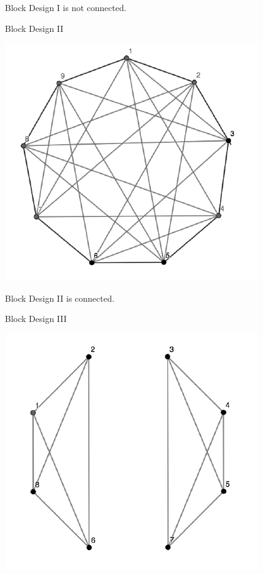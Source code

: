 \documentclass[12pt,]{article}
\begin{document}
Block Design I is not connected.

\begin{center}
Block Design II
\end{center}

\begin{center}\includegraphics{Markdown_HW_8_files/figure-latex/unnamed-chunk-8-1} \end{center}

Block Design II is connected.

\begin{center}
Block Design III
\end{center}

\begin{center}\includegraphics{Markdown_HW_8_files/figure-latex/unnamed-chunk-9-1} \end{center}
\end{document}
